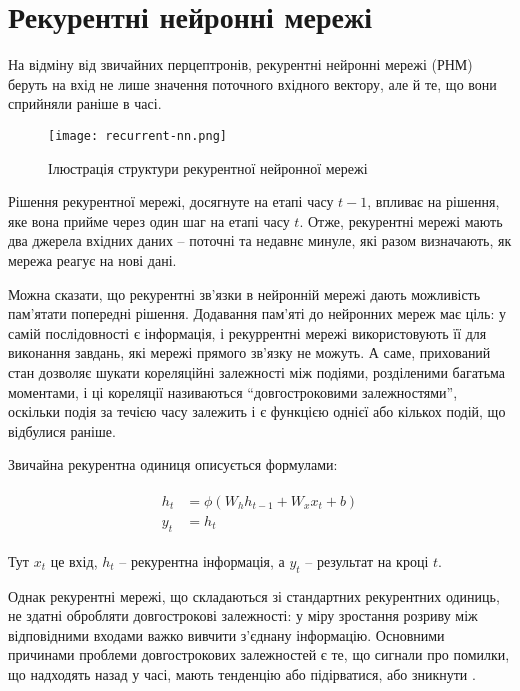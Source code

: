 
\section{Рекурентні нейронні мережі}

На відміну від звичайних перцептронів, рекурентні нейронні
мережі (РНМ)
беруть на вхід не лише значення поточного вхідного вектору,
але й те, що вони сприйняли раніше в часі.

\begin{figure}[H]
    \centering
    \texttt{[image: recurrent-nn.png]}
    \caption{Ілюстрація структури рекурентної нейронної мережі}
    \label{fig:rnn}
\end{figure}

Рішення рекурентної мережі, досягнуте на етапі часу $t-1$, впливає
на рішення, яке вона прийме через один шаг на етапі часу $t$.
Отже, рекурентні мережі мають два джерела вхідних даних -- поточні
та недавнє минуле, які разом визначають, як мережа
реагує на нові дані.

Можна сказати, що рекурентні зв'язки в нейронній мережі
дають можливість пам'ятати попередні рішення.
Додавання пам’яті до нейронних мереж має ціль: у самій послідовності
є інформація, і рекуррентні мережі використовують її для виконання
завдань, які мережі прямого зв'язку не можуть.
А саме, прихований стан дозволяє шукати
кореляційні залежності між подіями, розділеними багатьма моментами,
і ці кореляції називаються ``довгостроковими залежностями'',
оскільки подія за течією часу залежить і є функцією однієї
або кількох подій, що відбулися раніше.

Звичайна рекурентна одиниця описується формулами:

\vspace{0.5em}
\begin{gather}
\begin{aligned}
    h_t &= \phi(W_h h_{t-1}+W_x x_t+b)\\
    y_t &= h_t
\end{aligned}
\end{gather}
\vspace{\baselineskip}

Тут $x_t$ це вхід, $h_t$ -- рекурентна інформація, а $y_t$ -- 
результат на кроці $t$.

Однак рекурентні мережі, що складаються зі стандартних рекурентних
одиниць, не здатні обробляти довгострокові залежності: у міру
зростання розриву між відповідними входами важко
вивчити з'єднану інформацію. Основними причинами проблеми
довгострокових залежностей є те, що сигнали про помилки,
що надходять назад у часі, мають тенденцію або підірватися,
або зникнути \cite{nn:recurrent-hard}.


